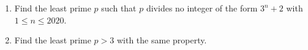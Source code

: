 \begin{enumerate}
\item[(a)] Find the least prime $p$ such that $p$ divides no integer of the form $3^n+2$ with $1\le n\le2020$.
\item[(b)] Find the least prime $p>3$ with the same property.
\end{enumerate}

